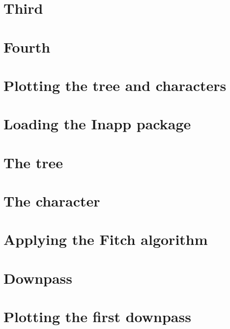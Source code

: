 \documentclass[]{book}
\theoremstyle{definition}
\theoremstyle{definition}
\theoremstyle{definition}
\theoremstyle{remark}
\begin{document}
\hypertarget{third-1}{%
\section{Third}\label{third-1}}

\hypertarget{fourth-1}{%
\section{Fourth}\label{fourth-1}}

\hypertarget{plotting-the-tree-and-characters}{%
\section{Plotting the tree and
characters}\label{plotting-the-tree-and-characters}}

\hypertarget{loading-the-inapp-package}{%
\section{Loading the Inapp package}\label{loading-the-inapp-package}}

\hypertarget{the-tree}{%
\section{The tree}\label{the-tree}}

\hypertarget{the-character}{%
\section{The character}\label{the-character}}

\hypertarget{applying-the-fitch-algorithm}{%
\section{Applying the Fitch
algorithm}\label{applying-the-fitch-algorithm}}

\hypertarget{downpass}{%
\section{Downpass}\label{downpass}}

\hypertarget{plotting-the-first-downpass}{%
\section{Plotting the first
downpass}\label{plotting-the-first-downpass}}
\end{document}
